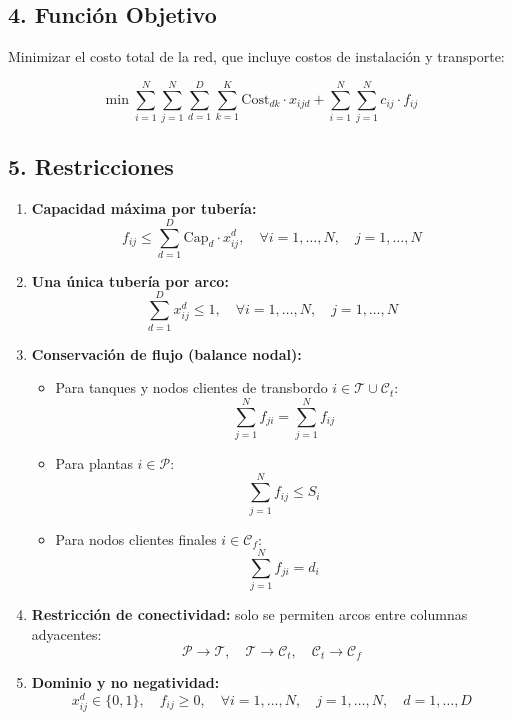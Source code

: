\documentclass[12pt]{article}
\begin{document}
\subsection*{4. Función Objetivo}

Minimizar el costo total de la red, que incluye costos de instalación y transporte:

\[
\min \sum_{i=1}^{N} \sum_{j=1}^{N} \sum_{d=1}^{D} \sum_{k=1}^{K} \text{Cost}_{dk} \cdot x_{ijd} + \sum_{i=1}^{N} \sum_{j=1}^{N} c_{ij} \cdot f_{ij}
\]

\subsection*{5. Restricciones}

\begin{enumerate}
  \item \textbf{Capacidad máxima por tubería:}
  \[
  f_{ij} \leq \sum_{d=1}^{D} \text{Cap}_d \cdot x_{ij}^d, \quad \forall i=1,\ldots,N, \quad j=1,\ldots,N
  \]

  \item \textbf{Una única tubería por arco:}
  \[
  \sum_{d=1}^{D} x_{ij}^d \leq 1, \quad \forall i=1,\ldots,N, \quad j=1,\ldots,N
  \]

  \item \textbf{Conservación de flujo (balance nodal):}
  \begin{itemize}
    \item Para tanques y nodos clientes de transbordo \( i \in \mathcal{T} \cup \mathcal{C}_t \):
    \[
    \sum_{j=1}^{N} f_{ji} = \sum_{j=1}^{N} f_{ij}
    \]
    \item Para plantas \( i \in \mathcal{P} \):
    \[
    \sum_{j=1}^{N} f_{ij} \leq S_i
    \]
    \item Para nodos clientes finales \( i \in \mathcal{C}_f \):
    \[
    \sum_{j=1}^{N} f_{ji} = d_i
    \]
  \end{itemize}

  \item \textbf{Restricción de conectividad:} solo se permiten arcos entre columnas adyacentes:
  \[
  \mathcal{P} \to \mathcal{T}, \quad \mathcal{T} \to \mathcal{C}_t, \quad \mathcal{C}_t \to \mathcal{C}_f
  \]

  \item \textbf{Dominio y no negatividad:}
  \[
  x_{ij}^d \in \{0,1\}, \quad f_{ij} \geq 0, \quad \forall i=1,\ldots,N, \quad j=1,\ldots,N, \quad d=1,\ldots,D
  \]
\end{enumerate}
\end{document}
